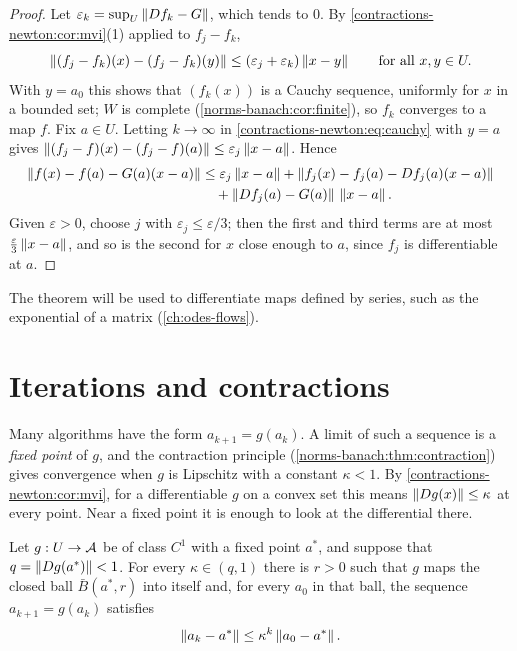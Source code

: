 \begin{notechapter}
\begin{proof}
Let $\varepsilon_k = \sup_U\left\|Df_k - G\right\|$, which tends to $0$. By
\cref{contractions-newton:cor:mvi}(1) applied to $f_j - f_k$,
\begin{equation}\label{contractions-newton:eq:cauchy}
  \left\|(f_j - f_k)(x) - (f_j - f_k)(y)\right\|
  \leq(\varepsilon_j + \varepsilon_k)\left\|x - y\right\|
  \qquad\text{for all } x, y\in U .
\end{equation}
With $y = a_0$ this shows that $(f_k(x))$ is a Cauchy sequence, uniformly
for $x$ in a bounded set; $W$ is complete
(\cref{norms-banach:cor:finite}), so $f_k$ converges to a map $f$. Fix
$a\in U$. Letting $k\to\infty$ in \eqref{contractions-newton:eq:cauchy}
with $y = a$ gives
$\left\|(f_j - f)(x) - (f_j - f)(a)\right\|\leq\varepsilon_j\left\|x - a\right\|$. Hence
\begin{align*}
  \left\|f(x) - f(a) - G(a)(x - a)\right\|
  &\leq\varepsilon_j\left\|x - a\right\|
   + \left\|f_j(x) - f_j(a) - Df_j(a)(x - a)\right\|\\
  &\quad+ \left\|Df_j(a) - G(a)\right\|\,\left\|x - a\right\| .
\end{align*}
Given $\varepsilon > 0$, choose $j$ with $\varepsilon_j\leq\varepsilon/3$;
then the first and third terms are at most
$\frac\varepsilon3\left\|x - a\right\|$, and so is the second for $x$ close enough
to $a$, since $f_j$ is differentiable at $a$.
\end{proof}

The theorem will be used to differentiate maps defined by series, such as
the exponential of a matrix (\cref{ch:odes-flows}).

\section{Iterations and contractions}\label{contractions-newton:sec:iterations}

Many algorithms have the form $a_{k+1} = g(a_k)$. A limit of such a
sequence is a \emph{fixed point} of $g$, and the contraction principle
(\cref{norms-banach:thm:contraction}) gives convergence when $g$ is
Lipschitz with a constant $\kappa < 1$. By
\cref{contractions-newton:cor:mvi}, for a differentiable $g$ on a convex
set this means $\left\|Dg(x)\right\|\leq\kappa$ at every point. Near a fixed point
it is enough to look at the differential there.

\begin{theorem}\label{contractions-newton:thm:local}
Let $g:U\to\mathcal{A}$ be of class $C^1$ with a fixed point $a^*$, and suppose
that $q = \left\|Dg(a^*)\right\| < 1$. For every $\kappa\in(q, 1)$ there is
$r > 0$ such that $g$ maps the closed ball $\bar B(a^*, r)$ into itself
and, for every $a_0$ in that ball, the sequence $a_{k+1} = g(a_k)$
satisfies
\[
  \left\|a_k - a^*\right\|\leq\kappa^k\left\|a_0 - a^*\right\| .
\]
\end{theorem}


\end{notechapter}
